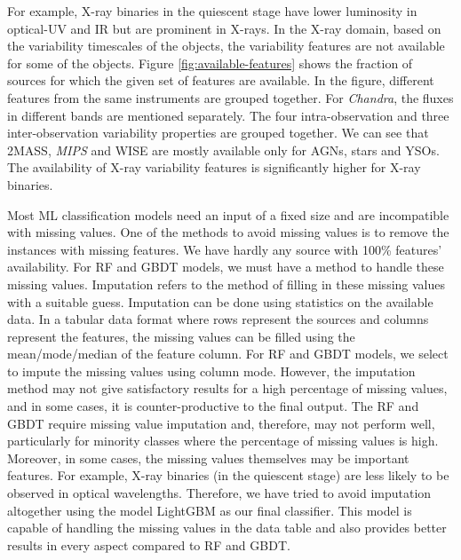 \documentclass[fleqn,usenatbib]{mnras}
\begin{document}
    For example, X-ray binaries in the quiescent stage have lower luminosity in optical-UV and IR but are prominent in X-rays. In the X-ray domain, based on the variability timescales of the objects, the variability features are not available for some of the objects. Figure \ref{fig:available-features} shows the fraction of sources for which the given set of features are available. In the figure, different features from the same instruments are grouped together. For {\em Chandra}, the fluxes in different bands are mentioned separately. The four intra-observation and three inter-observation variability properties are grouped together. We can see that 2MASS, {\em MIPS} and WISE are mostly available only for AGNs, stars and YSOs. The availability of X-ray variability features is significantly higher for X-ray binaries.
    
    Most ML classification models need an input of a fixed size and are incompatible with missing values. One of the methods to avoid missing values is to remove the instances with missing features. We have hardly any source with 100\% features' availability. For RF and GBDT models, we must have a method to handle these missing values. Imputation refers to the method of filling in these missing values with a suitable guess. Imputation can be done using statistics on the available data. In a tabular data format where rows represent the sources and columns represent the features, the missing values can be filled using the mean/mode/median of the feature column.  For RF and GBDT models, we select to impute the missing values using column mode. However, the imputation method may not give satisfactory results for a high percentage of missing values, and in some cases, it is counter-productive to the final output. The RF and GBDT require missing value imputation and, therefore, may not perform well, particularly for minority classes where the percentage of missing values is high. Moreover, in some cases, the missing values themselves may be important features. For example, X-ray binaries (in the quiescent stage) are less likely to be observed in optical wavelengths. Therefore, we have tried to avoid imputation altogether using the model LightGBM as our final classifier. This model is capable of handling the missing values in the data table and also provides better results in every aspect compared to RF and GBDT. 
    
\end{document}
